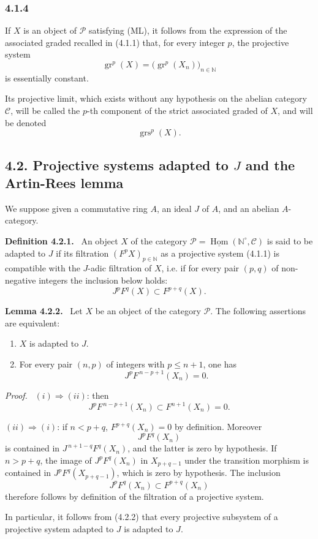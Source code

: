 \documentclass[11pt]{article}
\providecommand{\uHom}{\underline{\Hom}}
\newenvironment{statement}[1]{\par\medskip\noindent\textbf{#1.}\ }{\par\medskip}
\newenvironment{prooftext}[1][Proof]{\par\noindent\emph{#1.}\ }{\par\medskip}
\DeclareMathOperator{\Hom}{Hom}
\providecommand{\gr}{\operatorname{gr}}
\providecommand{\Hom}{\operatorname{Hom}}
\providecommand{\gr}{\operatorname{gr}}
\providecommand{\gr}{\operatorname{gr}}
\providecommand{\grs}{\operatorname{grs}}
\providecommand{\Hom}{\operatorname{Hom}}
\begin{document}
\subsubsection*{4.1.4}
If \(X\) is an object of \(\mathcal P\) satisfying (ML), it follows from the expression of the associated graded recalled in (4.1.1) that, for every integer \(p\), the projective system
\[
\gr^p(X)=\bigl(\gr^p(X_n)\bigr)_{n\in\mathbb N}
\]
is essentially constant.

Its projective limit, which exists without any hypothesis on the abelian category \(\mathcal C\), will be called the \(p\)-th component of the strict associated graded of \(X\), and will be denoted
\[
\grs^p(X).
\]

\subsection*{4.2. Projective systems adapted to \(J\) and the Artin-Rees lemma}

We suppose given a commutative ring \(A\), an ideal \(J\) of \(A\), and an abelian \(A\)-category.

\begin{statement}{Definition 4.2.1}
An object \(X\) of the category \(\mathcal P=\uHom(\mathbb N^\circ,\mathcal C)\) is said to be adapted to \(J\) if its filtration \((F^pX)_{p\in\mathbb N}\) as a projective system (4.1.1) is compatible with the \(J\)-adic filtration of \(X\), i.e. if for every pair \((p,q)\) of non-negative integers the inclusion below holds:
\[
J^pF^q(X)\subset F^{p+q}(X).
\]
\end{statement}

\begin{statement}{Lemma 4.2.2}
Let \(X\) be an object of the category \(\mathcal P\). The following assertions are equivalent:
\begin{enumerate}[label=\textup{(\roman*)}]
\item \(X\) is adapted to \(J\).
\item For every pair \((n,p)\) of integers with \(p\le n+1\), one has
\[
J^pF^{\,n-p+1}(X_n)=0 .
\]
\end{enumerate}
\end{statement}

\begin{prooftext}
\((i)\Rightarrow(ii)\): then
\[
J^pF^{\,n-p+1}(X_n)\subset F^{n+1}(X_n)=0.
\]

\((ii)\Rightarrow(i)\): if \(n<p+q\), \(F^{p+q}(X_n)=0\) by definition. Moreover
\[
J^pF^q(X_n)
\]
is contained in \(J^{\,n+1-q}F^q(X_n)\), and the latter is zero by hypothesis. If \(n> p+q\), the image of \(J^pF^q(X_n)\) in \(X_{p+q-1}\) under the transition morphism is contained in \(J^pF^q(X_{p+q-1})\), which is zero by hypothesis. The inclusion
\[
J^pF^q(X_n)\subset F^{p+q}(X_n)
\]
therefore follows by definition of the filtration of a projective system.

In particular, it follows from (4.2.2) that every projective subsystem of a projective system adapted to \(J\) is adapted to \(J\).
\end{prooftext}
\end{document}
